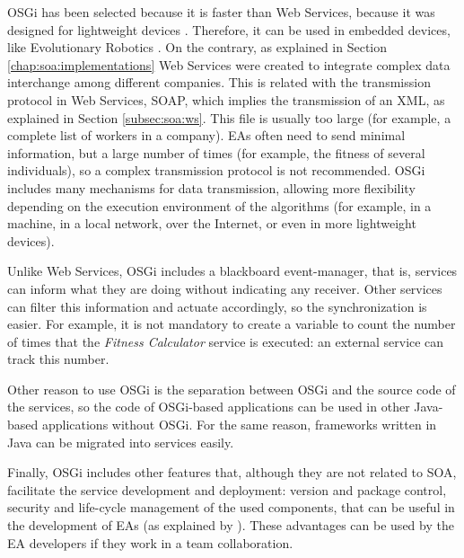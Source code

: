
OSGi has been selected because it is faster than Web Services, because it was designed for 
  lightweight devices \cite{LimGateway08}. Therefore, it can be
  used in embedded devices, like Evolutionary Robotics
  \cite{Garcia2012testing}. On the contrary, as explained in Section \ref{chap:soa:implementations} Web Services were created to integrate complex
  data interchange among different companies. This is related with the transmission protocol in Web Services, SOAP, which implies
  the transmission of an XML, as explained in Section \ref{subsec:soa:ws}. This file is usually too large (for example, a
  complete list of workers in a company). EAs often need to send
  minimal information, but a large number of times (for example, the
  fitness of several individuals), so a complex transmission protocol
  is not recommended. OSGi includes many mechanisms for data
  transmission, allowing more flexibility depending on the execution environment of
  the algorithms (for example, in a machine, in a local
  network, over the Internet, or even in more lightweight devices). 

Unlike Web Services, OSGi includes a blackboard e\-vent-ma\-na\-ger,
   that is, services can inform what they are doing without indicating 
 any receiver. Other services can filter this information and actuate
 accordingly, so the synchronization is easier. For example, it is not
 mandatory to create a variable to count the number of times that the
 {\em Fitness Calculator} service is executed: an external service can
 track this number. 

Other reason to use OSGi is the separation between OSGi and the source code of the
   services, so the code of OSGi-based applications can be used in other
   Java-based applications without OSGi. For the same reason,
   frameworks written in Java can be migrated into services easily.

Finally, OSGi includes other features that, although they are not related to SOA, facilitate the service development and deployment: version and package
   control, security and life-cycle management of the used
   components, that can be useful in the development of EAs 
   (as explained by  \cite{WagnerPlugins07}). These advantages can be used by the EA developers if
   they work in a team collaboration. %


